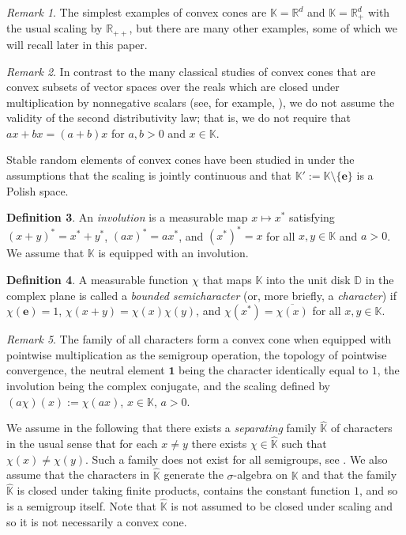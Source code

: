 \documentclass[12pt]{amsart}
\numberwithin{equation}{section}
\numberwithin{figure}{section}
\theoremstyle{plain} \newtheorem{theorem}{Theorem}[section]
\theoremstyle{plain} \newtheorem{proposition}[theorem]{Proposition}
\theoremstyle{plain} \newtheorem{lemma}[theorem]{Lemma}
\theoremstyle{plain} \newtheorem{corollary}[theorem]{Corollary}
\theoremstyle{definition} \newtheorem{definition}[theorem]{Definition}
\theoremstyle{definition} \newtheorem{notation}[theorem]{Notation}
\theoremstyle{remark} \newtheorem{remark}[theorem]{Remark}
\theoremstyle{remark} \newtheorem{example}[theorem]{Example}
\theoremstyle{definition} \newtheorem{assumption}{Assumption}
\newcommand{\bD}{\mathbb{D}}
\newcommand{\bK}{\mathbb{K}}
\newcommand{\bR}{\mathbb{R}}
\newcommand{\one}{\mathbf{1}}
\newcommand{\bKH}{\hat{\bK}}
\newcommand{\neutral}{\mathbf{e}}
\begin{document}
\begin{remark}
  The simplest examples of convex cones are $\bK = \bR^d$ and $\bK =
  \bR_+^d$ with the usual scaling by $\bR_{++}$, but there are many
  other examples, some of which we will recall later in this paper.
\end{remark}

\begin{remark}
  In contrast to the many classical studies of convex cones that are convex
  subsets of vector spaces over the reals which are closed under
  multiplication by nonnegative scalars (see, for example, \cite{fuc:lus81}),
  we do not assume the validity of the second distributivity law; that
  is, we do not require that $ax+bx=(a+b)x$ for $a,b > 0$ and $x \in
  \bK$.

  Stable random elements of convex cones have been studied in
  \cite{dav:mol:zuy08} under the assumptions that the scaling is
  jointly continuous and that $\bK':=\bK\setminus\{\neutral\}$ is a
  Polish space.
\end{remark}

\begin{definition}
  An \emph{involution} is a measurable map $x\mapsto x^*$ satisfying
  $(x+y)^*=x^*+y^*$, $(ax)^*=ax^*$, and $(x^*)^*=x$ for all
  $x,y\in\bK$ and $a>0$.  We assume that $\bK$ is equipped with an
  involution.
\end{definition}

\begin{definition}
  A measurable function $\chi$ that maps $\bK$ into the unit
  disk $\bD$ in the complex plane is called a {\em bounded
    semicharacter} (or, more briefly, a \emph{character}) if
  $\chi(\neutral)=1$, $\chi(x+y)=\chi(x)\chi(y)$, and
  $\chi(x^*)=\overline{\chi(x)}$ for all $x,y\in\bK$.
\end{definition}

\begin{remark}
  The family of all characters form a convex cone when equipped with
  pointwise multiplication as the semigroup operation, the topology of
  pointwise convergence, the neutral element $\one$ being the
  character identically equal to $1$, the involution being the complex
  conjugate, and the scaling defined by $(a\chi)(x):=\chi(ax)$,
  $x\in\bK$, $a>0$.
\end{remark}

We assume in the following that there exists a \emph{separating}
family $\bKH$ of characters in the usual sense that for each $x\neq y$
there exists $\chi\in\bKH$ such that $\chi(x)\neq\chi(y)$.  Such a
family does not exist for all semigroups, see
\cite[Ex.~8.20]{dav:mol:zuy08}. We also assume that the characters in
$\bKH$ generate the $\sigma$-algebra on $\bK$ and that the family
$\bKH$ is closed under taking finite products, contains the constant
function $1$, and so is a semigroup itself.  Note that $\bKH$ is not
assumed to be closed under scaling and so it is not necessarily a convex cone.
\end{document}
